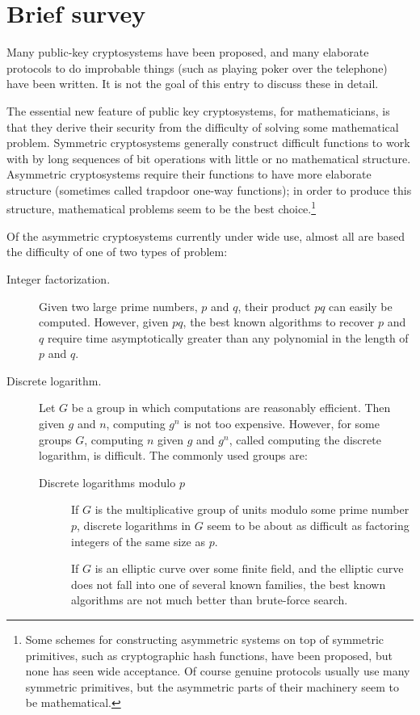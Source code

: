 \documentclass[12pt]{article}
\begin{document}
\section*{Brief survey}

Many public-key cryptosystems have been proposed, and many elaborate protocols to do improbable things (such as playing poker over the telephone) have been written.  It is not the goal of this entry to discuss these in detail.

The essential new feature of public key cryptosystems, for mathematicians, is that they derive their security from the difficulty of solving some mathematical problem.  Symmetric cryptosystems generally construct difficult functions to work with by long sequences of bit operations with little or no mathematical structure.  Asymmetric cryptosystems require their functions to have more elaborate structure (sometimes called trapdoor one-way functions); in order to produce this structure, mathematical problems seem to be the best choice.\footnote{Some schemes for constructing asymmetric systems on top of symmetric primitives, such as cryptographic hash functions, have been proposed, but none has seen wide acceptance.  Of course genuine protocols usually use many symmetric primitives, but the asymmetric parts of their machinery seem to be mathematical.}

Of the asymmetric cryptosystems currently under wide use, almost all are based the difficulty of one of two types of problem:
\begin{description}
\item[Integer factorization.]  Given two large prime numbers, $p$ and $q$, their product $pq$ can easily be computed.  However, given $pq$, the best known algorithms to recover $p$ and $q$ require time asymptotically greater than any polynomial in the length of $p$ and $q$.
\item[Discrete logarithm.] Let $G$ be a group in which computations are reasonably efficient.  Then given $g$ and $n$, computing $g^n$ is not too expensive.  However, for some groups $G$, computing $n$ given $g$ and $g^n$, called computing the discrete logarithm, is difficult.  The commonly used groups are:
\begin{description}
\item[Discrete logarithms modulo $p$] If $G$ is the multiplicative group of units modulo some prime number $p$, discrete logarithms in $G$ seem to be about as difficult as factoring integers of the same size as $p$.  
\item[] If $G$ is an elliptic curve over some finite field, and the elliptic curve does not fall into one of several known families, the best known algorithms are not much better than brute-force search.
\end{description}
\end{description}
\end{document}
